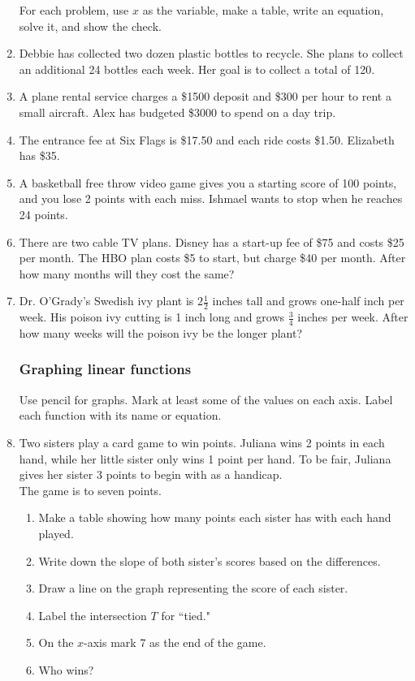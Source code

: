 \documentclass[12pt, oneside]{article}
\begin{document}
\begin{enumerate}
\newpage
For each problem, use $x$ as the variable, make a table, write an equation, solve it, and show the check. \\%

  \item Debbie has collected two dozen plastic bottles to recycle. She plans to collect an additional 24 bottles each week. Her goal is to collect a total of 120. \vspace{8cm}

  \item A plane rental service charges a \$1500 deposit and \$300 per hour to rent a small aircraft. Alex has budgeted \$3000 to spend on a day trip.

\newpage
  \item The entrance fee at Six Flags is \$17.50 and each ride costs \$1.50. Elizabeth has \$35. \vspace{8cm}

  \item A basketball free throw video game gives you a starting score of 100 points, and you lose 2 points with each miss. Ishmael wants to stop when he reaches 24 points.

\newpage
  \item There are two cable TV plans. Disney has a start-up fee of \$75 and costs \$25 per month. The HBO plan costs \$5 to start, but charge \$40 per month. After how many months will they cost the same?  \vspace{8cm}

  \item Dr. O'Grady's Swedish ivy plant is $2 \frac{1}{2}$ inches tall and grows one-half inch per week. His poison ivy cutting is 1 inch long and grows $\frac{3}{4}$ inches per week. After how many weeks will the poison ivy be the longer plant?

\newpage
\subsubsection*{Graphing linear functions}
Use pencil for graphs. Mark at least some of the values on each axis. Label each function with its name or equation.
\item Two sisters play a card game to win points. Juliana wins 2 points in each hand, while her little sister only wins 1 point per hand. To be fair, Juliana gives her sister 3 points to begin with as a handicap. \\
The game is to seven points.
  \begin{enumerate}
      \item Make a table showing how many points each sister has with each hand played. \bigskip
      \item Write down the slope of both sister's scores based on the differences. \bigskip
      \item Draw a line on the graph representing the score of each sister.
      \item Label the intersection $T$ for ``tied."
      \item On the $x$-axis mark 7 as the end of the game.
      \item Who wins? \bigskip
  \end{enumerate}


\end{enumerate}
\end{document}
